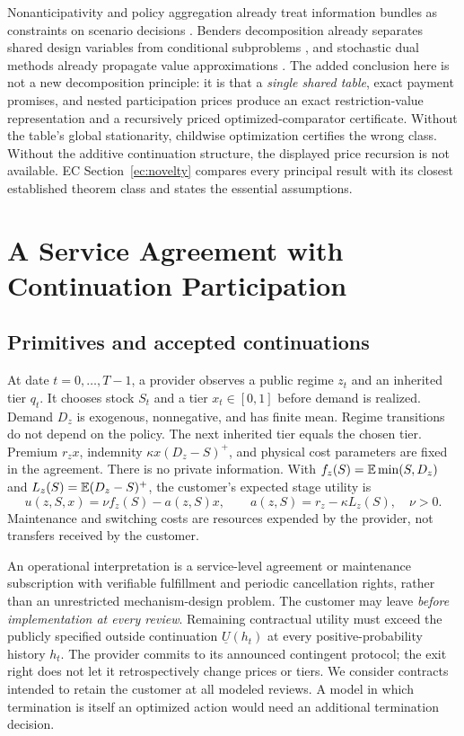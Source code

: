 \documentclass[11pt,letterpaper]{article}
\theoremstyle{definition}\newtheorem{assumption}[theorem]{Assumption}
\begin{document}

Nonanticipativity and policy aggregation already treat information bundles as constraints on scenario decisions \citep{RockafellarWets1991}. Benders decomposition already separates shared design variables from conditional subproblems \citep{Benders1962}, and stochastic dual methods already propagate value approximations \citep{PereiraPinto1991}. The added conclusion here is not a new decomposition principle: it is that a \emph{single shared table}, exact payment promises, and nested participation prices produce an exact restriction-value representation and a recursively priced optimized-comparator certificate. Without the table's global stationarity, childwise optimization certifies the wrong class. Without the additive continuation structure, the displayed price recursion is not available. EC Section~\ref{ec:novelty} compares every principal result with its closest established theorem class and states the essential assumptions.

\section{A Service Agreement with Continuation Participation}\label{sec:model}
\subsection{Primitives and accepted continuations}
At date $t=0,\ldots,T-1$, a provider observes a public regime $z_t$ and an inherited tier $q_t$. It chooses stock $S_t$ and a tier $x_t\in[0,1]$ before demand is realized. Demand $D_z$ is exogenous, nonnegative, and has finite mean. Regime transitions do not depend on the policy. The next inherited tier equals the chosen tier. Premium $r_zx$, indemnity $\kappa x(D_z-S)^+$, and physical cost parameters are fixed in the agreement. There is no private information. With $f_z(S)=\mathbb E\min(S,D_z)$ and $L_z(S)=\mathbb E(D_z-S)^+$, the customer's expected stage utility is
\begin{equation}\label{eq:customer}
 u(z,S,x)=\nu f_z(S)-a(z,S)x,\qquad a(z,S)=r_z-\kappa L_z(S),\quad \nu>0.
\end{equation}
Maintenance and switching costs are resources expended by the provider, not transfers received by the customer.

An operational interpretation is a service-level agreement or maintenance subscription with verifiable fulfillment and periodic cancellation rights, rather than an unrestricted mechanism-design problem. The customer may leave \emph{before implementation at every review}. Remaining contractual utility must exceed the publicly specified outside continuation $\underline U(h_t)$ at every positive-probability history $h_t$. The provider commits to its announced contingent protocol; the exit right does not let it retrospectively change prices or tiers. We consider contracts intended to retain the customer at all modeled reviews. A model in which termination is itself an optimized action would need an additional termination decision.
\end{document}
